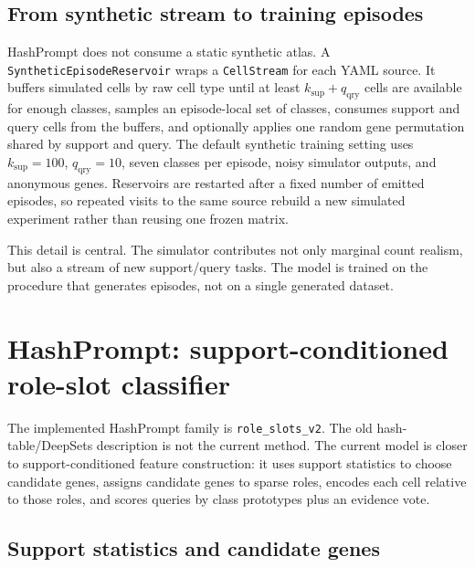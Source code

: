 \documentclass{article}
\begin{document}
\subsection{From synthetic stream to training episodes}

HashPrompt does not consume a static synthetic atlas. A \texttt{SyntheticEpisodeReservoir} wraps a \texttt{CellStream} for each YAML source. It buffers simulated cells by raw cell type until at least \(k_{\mathrm{sup}}+q_{\mathrm{qry}}\) cells are available for enough classes, samples an episode-local set of classes, consumes support and query cells from the buffers, and optionally applies one random gene permutation shared by support and query. The default synthetic training setting uses \(k_{\mathrm{sup}}=100\), \(q_{\mathrm{qry}}=10\), seven classes per episode, noisy simulator outputs, and anonymous genes. Reservoirs are restarted after a fixed number of emitted episodes, so repeated visits to the same source rebuild a new simulated experiment rather than reusing one frozen matrix.

This detail is central. The simulator contributes not only marginal count realism, but also a stream of new support/query tasks. The model is trained on the procedure that generates episodes, not on a single generated dataset.

\section{HashPrompt: support-conditioned role-slot classifier}

The implemented HashPrompt family is \texttt{role\_slots\_v2}. The old hash-table/DeepSets description is not the current method. The current model is closer to support-conditioned feature construction: it uses support statistics to choose candidate genes, assigns candidate genes to sparse roles, encodes each cell relative to those roles, and scores queries by class prototypes plus an evidence vote.

\subsection{Support statistics and candidate genes}
\end{document}

